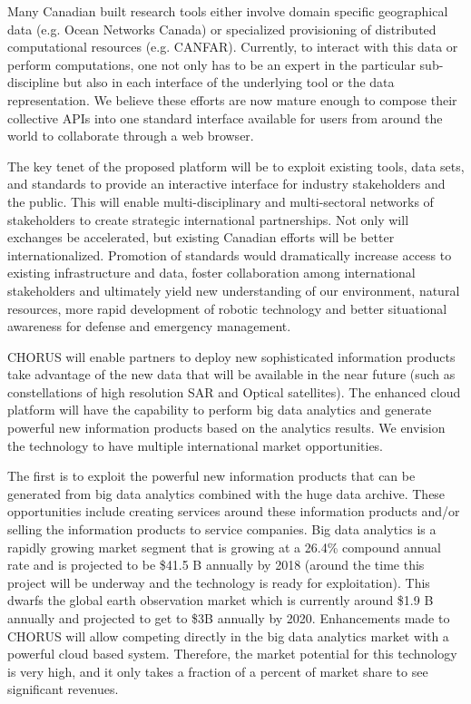 
Many Canadian built research tools either involve domain specific
geographical data (e.g. Ocean Networks Canada) or specialized
provisioning of distributed computational resources
(e.g. CANFAR). Currently, to interact with this data or perform
computations, one not only has to be an expert in the particular
sub-discipline but also in each interface of the underlying tool or
the data representation.  We believe these efforts are now mature
enough to compose their collective APIs into one standard interface
available for users from around the world to collaborate through a web
browser.

The key tenet of the proposed platform will be to exploit existing
tools, data sets, and standards to provide an interactive interface
for industry stakeholders and the public.  This will enable
multi-disciplinary and multi-sectoral networks of stakeholders to
create strategic international partnerships. Not only will exchanges
be accelerated, but existing Canadian efforts will be better
internationalized.  Promotion of standards would dramatically increase
access to existing infrastructure and data, foster collaboration among
international stakeholders and ultimately yield new understanding of
our environment, natural resources, more rapid development of robotic
technology and better situational awareness for defense and emergency
management.

CHORUS will enable partners to deploy new sophisticated information
products take advantage of the new data that will be available in the
near future (such as constellations of high resolution SAR and Optical
satellites).  The enhanced cloud platform will have the capability to
perform big data analytics and generate powerful new information
products based on the analytics results. We envision the technology to
have multiple international market opportunities.

The first is to exploit the powerful new information products that can
be generated from big data analytics combined with the huge data
archive. These opportunities include creating services around these
information products and/or selling the information products to
service companies.  Big data analytics is a rapidly growing market
segment that is growing at a 26.4\% compound annual rate and is
projected to be \$41.5 B annually by 2018 (around the time this project
will be underway and the technology is ready for exploitation). This
dwarfs the global earth observation market which is currently around
\$1.9 B annually and projected to get to \$3B annually by 2020.
Enhancements made to CHORUS will allow competing directly in the big
data analytics market with a powerful cloud based system. Therefore,
the market potential for this technology is very high, and it only
takes a fraction of a percent of market share to see significant
revenues.

